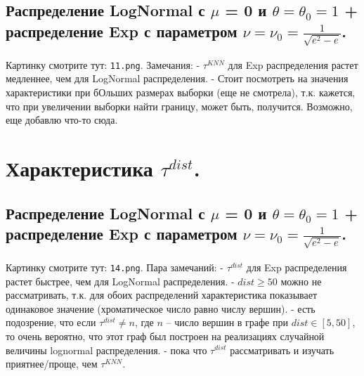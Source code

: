 \documentclass{report}
\begin{document}
\subsection{Распределение LogNormal с $\mu$ = 0 и $\theta = \theta_0 = 1$ + распределение Exp с параметром $\nu = \nu_0 = \frac{1}{\sqrt{e^2 - e}}$.}
Картинку смотрите тут: \texttt{11.png}.
\newline
\newline
Замечания:
\newline
\newline
- $\tau^{KNN}$ для Exp распределения растет медленнее, чем для LogNormal распределения.
\newline
\newline
- Стоит посмотреть на значения характеристики при бОльших размерах выборки (еще не смотрела), т.к. кажется, что при увеличении выборки найти границу, может быть, получится.
\newline
\newline
Возможно, еще добавлю что-то сюда.

\section{Характеристика $\tau^{dist}$.}
\subsection{Распределение LogNormal с $\mu$ = 0 и $\theta = \theta_0 = 1$ + распределение Exp с параметром $\nu = \nu_0 = \frac{1}{\sqrt{e^2 - e}}$.}
Картинку смотрите тут: \texttt{14.png}.
\newline
\newline
Пара замечаний:
\newline
\newline
- $\tau^{dist}$ для Exp распределения растет быстрее, чем для LogNormal распределения.
\newline
\newline
- $dist \ge 50$ можно не рассматривать, т.к. для обоих распределений характеристика показывает одинаковое значение (хроматическое число равно числу вершин).
\newline
\newline
- есть подозрение, что если $\tau^{dist} \ne n$, где $n$ -- число вершин в графе при $dist \in [5, 50]$, то очень вероятно, что этот граф был построен на реализациях случайной величины lognormal распределения.
\newline
\newline
- пока что $\tau^{dist}$ рассматривать и изучать приятнее/проще, чем $\tau^{KNN}$.
\end{document}
